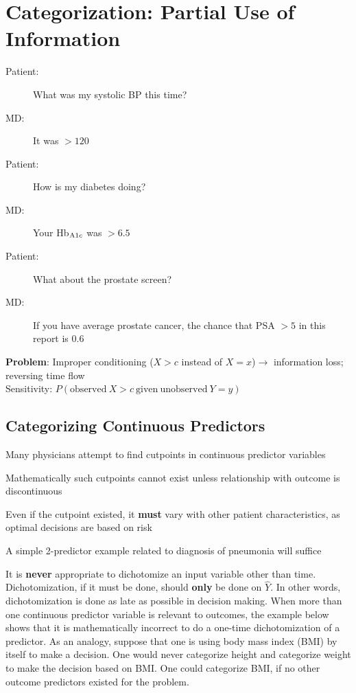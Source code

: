 \section{Categorization: Partial Use of Information}
\begin{description}
\item[Patient:] What was my systolic BP this time?
\item[MD:] It was $> 120$
\item[Patient:] How is my diabetes doing?
\item[MD:] Your Hb$_{\textrm A1c}$ was $> 6.5$
\item[Patient:] What about the prostate screen?
\item[MD:] If you have average prostate cancer, the chance that PSA $> 5$ in this report is $0.6$
\end{description}
\textbf{Problem}: Improper conditioning ($X > c$ instead of $X =
x$)$\rightarrow$ information loss; reversing time flow\\ Sensitivity: $P(\mathrm{observed~} X > c \mathrm{~given~unobserved~} Y=y)$

\subsection{Categorizing Continuous Predictors}%
\bi
\item Many physicians attempt to find cutpoints in continuous
  predictor variables
\item Mathematically such cutpoints cannot exist unless relationship
  with outcome is discontinuous
\item Even if the cutpoint existed, it \textbf{must} vary with other patient
  characteristics, as optimal decisions are based on risk
\item A simple 2-predictor example related to diagnosis of pneumonia
  will suffice
\item It is \textbf{never} appropriate to dichotomize an input
  variable other than time.  Dichotomization, if it must be done,
  should \textbf{only} be done on $\hat{Y}$.  In other words,
  dichotomization is done as late as possible in decision making.
  When more than one continuous predictor variable is relevant to
  outcomes, the example below shows that it is mathematically
  incorrect to do a one-time dichotomization of a predictor.
  As an analogy, suppose that one is using
  body mass index (BMI) by itself to make a decision.  One would never
  categorize height and categorize weight to make the decision based
  on BMI.  One
  could categorize BMI, if no other outcome predictors existed for the problem.
\ei

